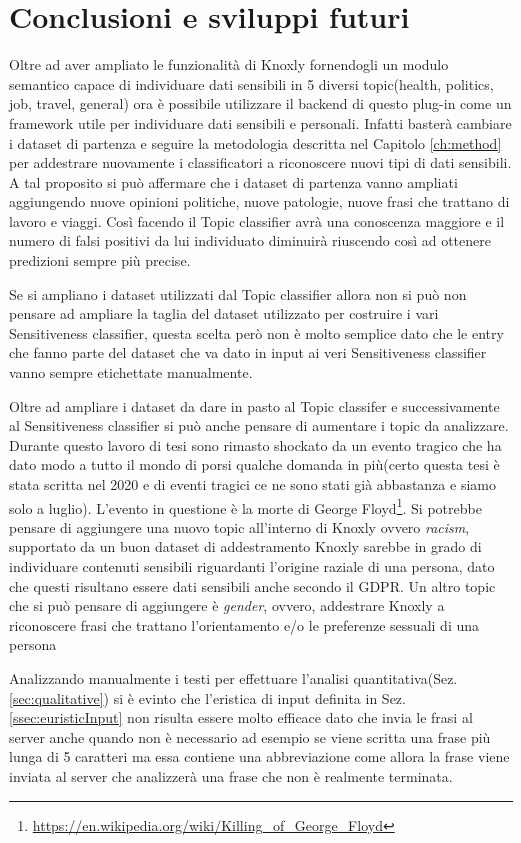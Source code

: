 \chapter{Conclusioni e sviluppi futuri}

Oltre ad aver ampliato le funzionalità di Knoxly fornendogli un modulo semantico capace di individuare dati sensibili in 5 diversi topic(health, politics, job, travel, general) ora è possibile utilizzare il backend di questo plug-in come un framework utile per individuare dati sensibili e personali. Infatti basterà cambiare i dataset di partenza e seguire la metodologia descritta nel Capitolo \ref{ch:method}  per addestrare nuovamente i classificatori a riconoscere nuovi tipi di dati sensibili. A tal proposito si può affermare che i dataset di partenza vanno ampliati aggiungendo nuove opinioni politiche, nuove patologie, nuove frasi che trattano di lavoro e viaggi. Così facendo il Topic classifier avrà una conoscenza maggiore e il numero di falsi positivi da lui individuato diminuirà riuscendo così ad ottenere predizioni sempre più precise.

Se si ampliano i dataset utilizzati dal Topic classifier allora non si può non pensare ad ampliare la taglia del dataset utilizzato per costruire i vari Sensitiveness classifier, questa scelta però non è molto semplice dato che le entry che fanno parte del dataset che va dato in input ai veri Sensitiveness classifier vanno sempre etichettate manualmente.

Oltre ad ampliare i dataset da dare in pasto al Topic classifer e successivamente al Sensitiveness classifier si può anche pensare di aumentare i topic da analizzare. Durante questo lavoro di tesi sono rimasto shockato da un evento tragico che ha dato modo a tutto il mondo di porsi qualche domanda in più(certo questa tesi è stata scritta nel 2020 e di eventi tragici ce ne sono stati già abbastanza e siamo solo a luglio). L'evento in questione è la morte di George Floyd\footnote{\url{https://en.wikipedia.org/wiki/Killing_of_George_Floyd}}. Si potrebbe pensare di aggiungere una nuovo topic all'interno di Knoxly ovvero \textit{racism}, supportato da un buon dataset di addestramento Knoxly sarebbe in grado di individuare contenuti sensibili riguardanti l'origine raziale di una persona, dato che questi risultano essere dati sensibili anche secondo il GDPR. Un altro topic che si può pensare di aggiungere è \textit{gender}, ovvero, addestrare Knoxly a riconoscere frasi che trattano l'orientamento e/o le preferenze sessuali di una persona

Analizzando manualmente i testi per effettuare l'analisi quantitativa(Sez. \ref{sec:qualitative}) si è evinto che l'eristica di input definita in Sez. \ref{ssec:euristicInput} non risulta essere molto efficace dato che invia le frasi al server anche quando non è necessario ad esempio se viene scritta una frase più lunga di 5 caratteri ma essa contiene una abbreviazione come  allora la frase viene inviata al server che analizzerà una frase che non è realmente terminata.